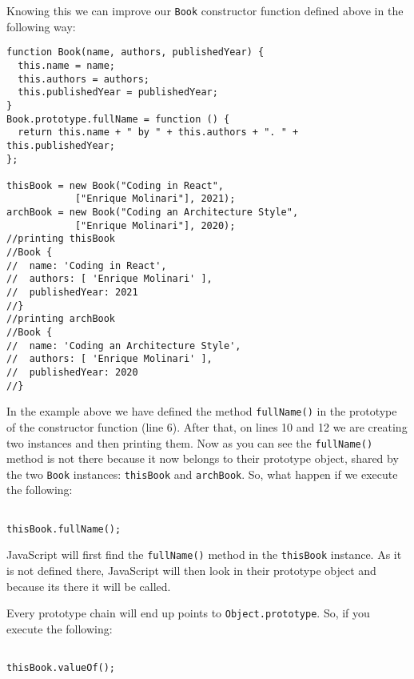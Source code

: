 \documentclass[a4paper, oneside, titlepage, 12pt]{book}
\begin{document}
Knowing this we can improve our \texttt{Book} constructor function defined above in the following way:

\begin{verbatim}
function Book(name, authors, publishedYear) {
  this.name = name;
  this.authors = authors;
  this.publishedYear = publishedYear;
}
Book.prototype.fullName = function () {
  return this.name + " by " + this.authors + ". " + this.publishedYear;
};               
               
thisBook = new Book("Coding in React", 
			["Enrique Molinari"], 2021);
archBook = new Book("Coding an Architecture Style", 
			["Enrique Molinari"], 2020);
//printing thisBook
//Book {
//  name: 'Coding in React',
//  authors: [ 'Enrique Molinari' ],
//  publishedYear: 2021
//}
//printing archBook
//Book {
//  name: 'Coding an Architecture Style',
//  authors: [ 'Enrique Molinari' ],
//  publishedYear: 2020
//}
\end{verbatim}

In the example above we have defined the method \texttt{fullName()} in the prototype of the constructor function (line 6). After that, on lines 10 and 12 we are creating two instances and then printing them. Now as you can see the \texttt{fullName()} method is not there because it now belongs to their prototype object, shared by the two \texttt{Book} instances: \texttt{thisBook} and \texttt{archBook}. So, what happen if we execute the following:

\begin{verbatim}

thisBook.fullName();
\end{verbatim}

JavaScript will first find the \texttt{fullName()} method in the \texttt{thisBook} instance. As it is not defined there, JavaScript will then look in their prototype object and because its there it will be called. 

Every prototype chain will end up points to \texttt{Object.prototype}. So, if you execute the following:

\begin{verbatim}

thisBook.valueOf();
\end{verbatim}
\end{document}
